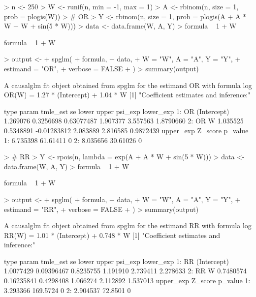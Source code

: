 \documentclass{article}
\begin{document}
\begin{Schunk}
\begin{Sinput}
> n <- 250
> W <- runif(n, min = -1, max = 1)
> A <- rbinom(n, size = 1, prob = plogis(W))
> # OR
> Y <- rbinom(n, size = 1, prob = plogis(A + A * W + W + sin(5 * W)))
> data <- data.frame(W, A, Y)
> formula ~ 1 + W
\end{Sinput}
\begin{Soutput}
formula ~ 1 + W
\end{Soutput}
\begin{Sinput}
> output <-
+   spglm(
+     formula,
+     data,
+     W = "W", A = "A", Y = "Y",
+     estimand = "OR",
+     verbose = FALSE
+   )
> summary(output)
\end{Sinput}
\begin{Soutput}
A causalglm fit object obtained from spglm for the estimand OR with formula 
log OR(W) = 1.27 * (Intercept) + 1.04 * W
[1] "Coefficient estimates and inference:"

   type       param tmle_est        se       lower    upper  psi_exp lower_exp
1:   OR (Intercept) 1.269076 0.3256698  0.63077487 1.907377 3.557563 1.8790660
2:   OR           W 1.035525 0.5348891 -0.01283812 2.083889 2.816585 0.9872439
   upper_exp  Z_score p_value
1:  6.735398 61.61411       0
2:  8.035656 30.61026       0
\end{Soutput}
\begin{Sinput}
> # RR
> Y <- rpois(n, lambda = exp(A + A * W + sin(5 * W)))
> data <- data.frame(W, A, Y)
> formula ~ 1 + W
\end{Sinput}
\begin{Soutput}
formula ~ 1 + W
\end{Soutput}
\begin{Sinput}
> output <-
+   spglm(
+     formula,
+     data,
+     W = "W", A = "A", Y = "Y",
+     estimand = "RR",
+     verbose = FALSE
+   )
> summary(output)
\end{Sinput}
\begin{Soutput}
A causalglm fit object obtained from spglm for the estimand RR with formula 
log RR(W) = 1.01 * (Intercept) + 0.748 * W
[1] "Coefficient estimates and inference:"

   type       param  tmle_est         se     lower    upper  psi_exp lower_exp
1:   RR (Intercept) 1.0077429 0.09396467 0.8235755 1.191910 2.739411  2.278633
2:   RR           W 0.7480574 0.16235841 0.4298408 1.066274 2.112892  1.537013
   upper_exp  Z_score p_value
1:  3.293366 169.5724       0
2:  2.904537  72.8501       0
\end{Soutput}
\end{Schunk}
\end{document}
